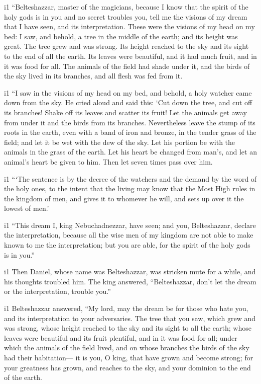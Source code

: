 i1 ``Belteshazzar, master of the magicians, because I know
that the spirit of the holy gods is in you and no secret troubles you,
tell me the visions of my dream that I have seen, and its
interpretation.  These were the visions of my head on my
bed: I saw, and behold, a tree in the middle of the earth; and its
height was great.  The tree grew and was strong. Its height
reached to the sky and its sight to the end of all the earth.
 Its leaves were beautiful, and it had much fruit, and in
it was food for all. The animals of the field had shade under it, and
the birds of the sky lived in its branches, and all flesh was fed from
it.

i1 ``I saw in the visions of my head on my bed, and behold,
a holy watcher came down from the sky.  He cried aloud and
said this: `Cut down the tree, and cut off its branches! Shake off its
leaves and scatter its fruit! Let the animals get away from under it and
the birds from its branches.  Nevertheless leave the stump
of its roots in the earth, even with a band of iron and bronze, in the
tender grass of the field; and let it be wet with the dew of the sky.
Let his portion be with the animals in the grass of the earth.
 Let his heart be changed from man's, and let an animal's
heart be given to him. Then let seven times pass over him.

i1 ```The sentence is by the decree of the watchers and the
demand by the word of the holy ones, to the intent that the living may
know that the Most High rules in the kingdom of men, and gives it to
whomever he will, and sets up over it the lowest of men.'

i1 ``This dream I, king Nebuchadnezzar, have seen; and you,
Belteshazzar, declare the interpretation, because all the wise men of my
kingdom are not able to make known to me the interpretation; but you are
able, for the spirit of the holy gods is in you.''

i1 Then Daniel, whose name was Belteshazzar, was stricken
mute for a while, and his thoughts troubled him. The king answered,
``Belteshazzar, don't let the dream or the interpretation, trouble
you.''

i1 Belteshazzar answered, ``My lord, may the dream be for those who hate
you, and its interpretation to your adversaries.  The tree
that you saw, which grew and was strong, whose height reached to the sky
and its sight to all the earth;  whose leaves were
beautiful and its fruit plentiful, and in it was food for all; under
which the animals of the field lived, and on whose branches the birds of
the sky had their habitation---  it is you, O king, that
have grown and become strong; for your greatness has grown, and reaches
to the sky, and your dominion to the end of the earth.

